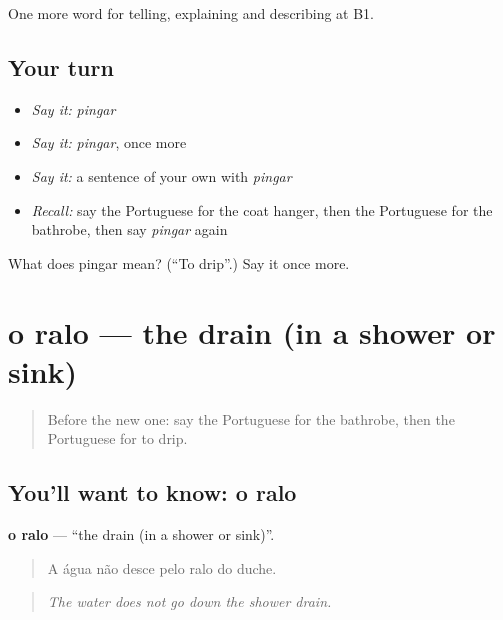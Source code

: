 \begin{grammarlens}[title={What you've built}]
One more word for telling, explaining and describing at B1.
\end{grammarlens}

\subsection*{Your turn}
\begin{itemize}
\raggedright
  \item \emph{Say it:} \emph{pingar}
  \item \emph{Say it:} \emph{pingar}, once more
  \item \emph{Say it:} a sentence of your own with \emph{pingar}
  \item \emph{Recall:} say the Portuguese for the coat hanger, then the Portuguese for the bathrobe, then say \emph{pingar} again
\end{itemize}

\begin{tcolorbox}[breakable,colback=teal!4,colframe=teal!35!black,title={Before you move on}]
What does pingar mean? (\textquotedblleft{}To drip\textquotedblright{}.) Say it once more.
\end{tcolorbox}
\section[o ralo]{o ralo — the drain (in a shower or sink)}

\label{lesson:PT-C430-ralo}



\begin{quote}
Before the new one: say the Portuguese for the bathrobe, then the Portuguese for to drip.
\end{quote}

\subsection*{You'll want to know: o ralo}
\textbf{o ralo} — \textquotedblleft{}the drain (in a shower or sink)\textquotedblright{}.

\begin{quote}
A água não desce pelo ralo do duche.
\end{quote}

\begin{quote}
\emph{The water does not go down the shower drain.}
\end{quote}

